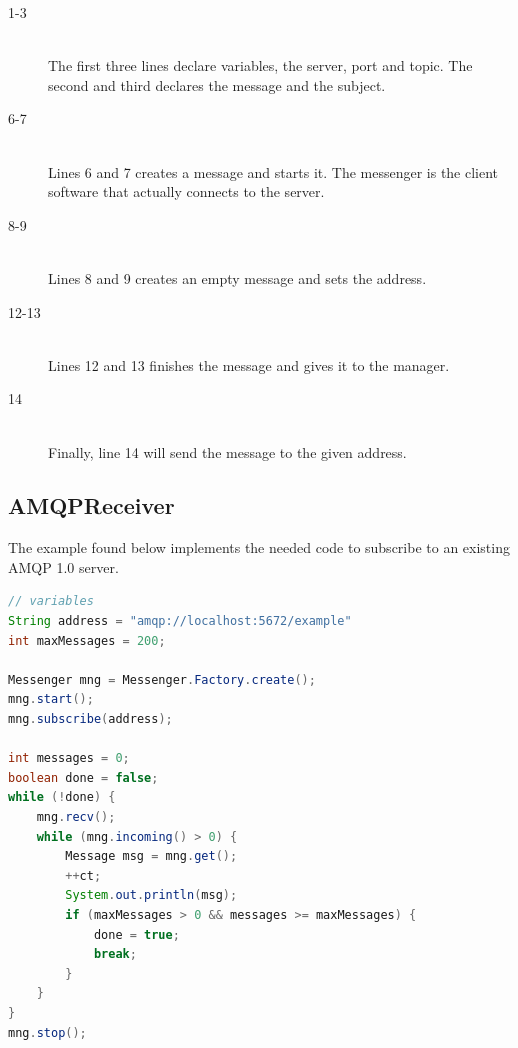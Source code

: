 \begin{description}
\item[1-3] \hfill \\ The first three lines declare variables, the server, port and topic. The second and third declares the message and the subject.
\item[6-7] \hfill \\ Lines 6 and 7 creates a message and starts it. The messenger is the client software that actually connects to the server.
\item[8-9] \hfill \\ Lines 8 and 9 creates an empty message and sets the address.
\item[12-13] \hfill \\ Lines 12 and 13 finishes the message and gives it to the manager.
\item[14] \hfill \\ Finally, line 14 will send the message to the given address.
\end{description}

\subsection{AMQPReceiver}
The example found below implements the needed code to subscribe to an existing AMQP 1.0 server.


\begin{lstlisting}[language=Java, captionpos=b, caption=Example use of Messenger to subscribe, frame=bt, showstringspaces=false,label={lst:AMQPReceiver}]
// variables
String address = "amqp://localhost:5672/example"
int maxMessages = 200;

Messenger mng = Messenger.Factory.create();
mng.start();
mng.subscribe(address);

int messages = 0;
boolean done = false;
while (!done) {
    mng.recv();
    while (mng.incoming() > 0) {
        Message msg = mng.get();
        ++ct;
        System.out.println(msg);
        if (maxMessages > 0 && messages >= maxMessages) {
            done = true;
            break;
        }
    }
}
mng.stop();
\end{lstlisting}

